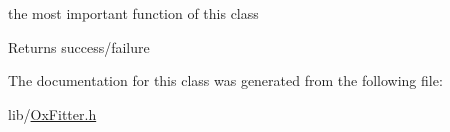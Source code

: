 the most important function of this class \begin{DoxyReturn}{Returns}
success/failure 
\end{DoxyReturn}


The documentation for this class was generated from the following file\-:\begin{DoxyCompactItemize}
\item 
lib/\hyperlink{_ox_fitter_8h}{Ox\-Fitter.\-h}\end{DoxyCompactItemize}
